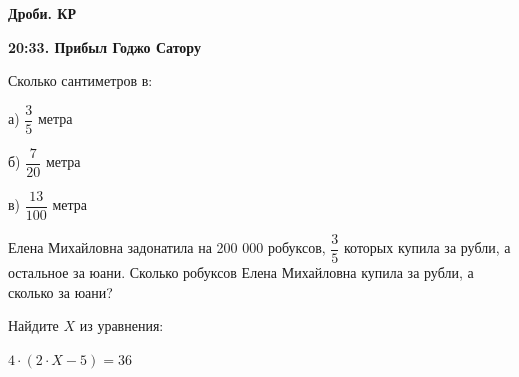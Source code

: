 \centerline{\bf \Huge Дроби. КР}
\centerline{\bf \Huge }

\begin{flushright}
        \scriptsize{\textbf{20:33. Прибыл Годжо Сатору}}
\end{flushright}

 Сколько сантиметров в:

а) $\dfrac{3}{5}$ метра

б) $\dfrac{7}{20}$ метра

в) $\dfrac{13}{100}$ метра


 Елена Михайловна задонатила на 200 000 робуксов, $\dfrac{3}{5}$ которых купила за рубли, а остальное за юани. Сколько робуксов Елена Михайловна купила за рубли, а сколько за юани?

 Найдите $X$ из уравнения:

$4\cdot(2\cdot X - 5)=36$
